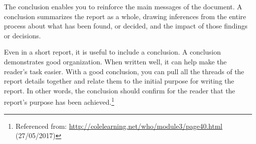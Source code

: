
The conclusion enables you to reinforce the main messages of the document.
A conclusion summarizes the report as a whole,
drawing inferences from the entire process about what has been found, or decided,
and the impact of those findings or decisions.

Even in a short report, it is useful to include a conclusion.
A conclusion demonstrates good organization.
When written well, it can help make the reader's task easier.
With a good conclusion, you can pull all the threads of the report details together and
relate them to the initial purpose for writing the report.
In other words, the conclusion should confirm for the reader that the report's purpose has been achieved.\footnote{Referenced from: \url{http://colelearning.net/who/module3/page40.html} (27/05/2017)}
